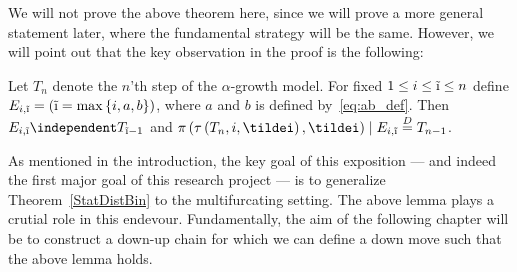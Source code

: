 %
We will not prove the above theorem here, since we will prove a more general statement later, where the fundamental strategy will be the same.
However, we will point out that the key observation in the proof is the following:
%
\begin{lemma}
  Let $T_n$ denote the $n$'th step of the $\alpha$-growth model. 
  For fixed $1 \leq i \leq \tilde{\text{\i}} \leq n$ define $E_{i,\tilde{\text{\i}}} = \left( \tilde{\text{\i}} = \max\left\{ i, a, b \right\} \right)$, where $a$ and $b$ is defined by~\eqref{eq:ab_def}.
  Then $E_{i,\tilde{\text{\i}}} \independent T_{\tilde{\text{\i}}-1}$ and $\pi\left(\tau\left(T_n, i, \tildei\right), \tildei \right) \mid E_{i,\tilde{\text{\i}}} \stackrel{D}{=} T_{n-1}$.
\end{lemma}
%
As mentioned in the introduction, the key goal of this exposition --- and indeed the first major goal of this research project --- is to generalize Theorem~\ref{StatDistBin} to the multifurcating setting.
The above lemma plays a crutial role in this endevour.
Fundamentally, the aim of the following chapter will be to construct a down-up chain for which we can define a down move such that the above lemma holds.

